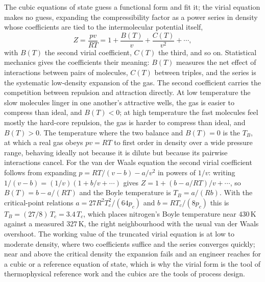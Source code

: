 \begin{mastery}
The cubic equations of state guess a functional form and fit it; the virial
equation makes no guess, expanding the compressibility factor as a power
series in density whose coefficients are tied to the intermolecular
potential itself,
\[
Z = \frac{pv}{RT} = 1 + \frac{B(T)}{v} + \frac{C(T)}{v^2} + \cdots,
\]
with $B(T)$ the second virial coefficient, $C(T)$ the third, and so on.
Statistical mechanics gives the coefficients their meaning: $B(T)$ measures
the net effect of interactions between pairs of molecules, $C(T)$ between
triples, and the series is the systematic low-density expansion of the gas.
The second coefficient carries the competition between repulsion and
attraction directly. At low temperature the slow molecules linger in one
another's attractive wells, the gas is easier to compress than ideal, and
$B(T) < 0$; at high temperature the fast molecules feel mostly the
hard-core repulsion, the gas is harder to compress than ideal, and $B(T) >
0$. The temperature where the two balance and $B(T) = 0$ is the
 $T_B$, at which a real gas obeys $pv = RT$ to
first order in density over a wide pressure range, behaving ideally not
because it is dilute but because its pairwise interactions cancel. For the
van der Waals equation the second virial coefficient follows from expanding
$p = RT/(v-b) - a/v^2$ in powers of $1/v$: writing $1/(v-b) = (1/v)(1 +
b/v + \cdots)$ gives $Z = 1 + (b - a/RT)/v + \cdots$, so $B(T) = b - a/(RT)$
and the Boyle temperature is $T_B = a/(Rb)$. With the critical-point
relations $a = 27R^2T_c^2/(64p_c)$ and $b = RT_c/(8p_c)$ this is $T_B =
(27/8)\,T_c = 3.4\,T_c$, which places nitrogen's Boyle temperature near
$430\,\si{\kelvin}$ against a measured $327\,\si{\kelvin}$, the right
neighbourhood with the usual van der Waals overshoot. The working value of
the truncated virial equation is at low to moderate density, where two
coefficients suffice and the series converges quickly; near and above the
critical density the expansion fails and an engineer reaches for a cubic or
a reference equation of state, which is why the virial form is the tool of
thermophysical reference work and the cubics are the tools of process
design.
\end{mastery}


